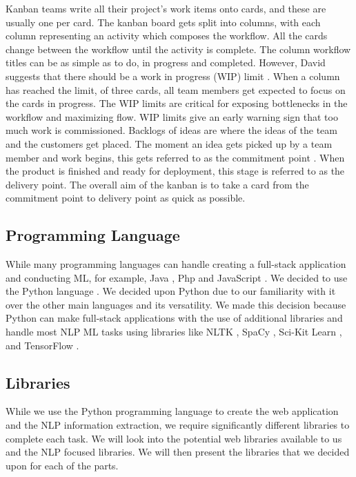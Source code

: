	Kanban teams write all their project's work items onto cards, and these are usually one per card. The kanban board gets split into columns, with each column representing an activity which composes the workflow. All the cards change between the workflow until the activity is complete. The column workflow titles can be as simple as to do, in progress and completed. However, David suggests that there should be a work in progress (WIP) limit \cite{anderson2010kanban}. When a column has reached the limit, of three cards, all team members get expected to focus on the cards in progress. The WIP limits are critical for exposing bottlenecks in the workflow and maximizing flow. WIP limits give an early warning sign that too much work is commissioned. Backlogs of ideas are where the ideas of the team and the customers get placed. The moment an idea gets picked up by a team member and work begins, this gets referred to as the commitment point \cite{anderson2010kanban}. When the product is finished and ready for deployment, this stage is referred to as the delivery point. The overall aim of the kanban is to take a card from the commitment point to delivery point as quick as possible. 
	
	
	\subsection{Programming Language}
	While many programming languages can handle creating a full-stack application and conducting ML, for example, Java \cite{arnold2005java}, Php \cite{bakken2000php} and JavaScript \cite{flanagan2006javascript}. We decided to use the Python language \cite{Python}. We decided upon Python due to our familiarity with it over the other main languages and its versatility. We made this decision because Python can make full-stack applications with the use of additional libraries and handle most NLP ML tasks using libraries like NLTK \cite{loper2002nltk}, SpaCy \cite{spacy2}, Sci-Kit Learn \cite{scikit-learn}, and TensorFlow \cite{tensorflow2015-whitepaper}.
	
	\subsection{Libraries}
	While we use the Python programming language to create the web application and the NLP information extraction, we require significantly different libraries to complete each task. We will look into the potential web libraries available to us and the NLP focused libraries. We will then present the libraries that we decided upon for each of the parts.
	
